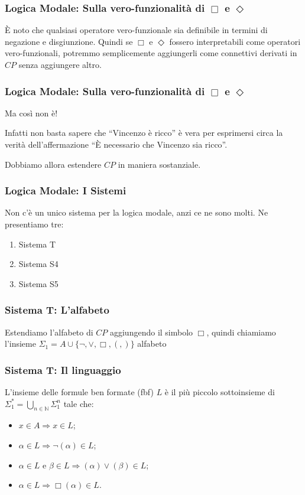 \documentclass[notheorem]{beamer}
\begin{document}
\begin{frame}
\frametitle{Logica Modale: Sulla vero-funzionalità di $\Box$ e $\Diamond$}
È noto che qualsiasi operatore vero-funzionale sia definibile in termini
di negazione e disgiunzione. Quindi se $\Box$ e $\Diamond$ fossero interpretabili
come operatori vero-funzionali, potremmo semplicemente aggiungerli come connettivi
derivati in $CP$ senza aggiungere altro.

\end{frame}

\begin{frame}
\frametitle{Logica Modale: Sulla vero-funzionalità di $\Box$ e $\Diamond$}
Ma così non è!

Infatti non basta sapere che ``Vincenzo è ricco'' è vera per esprimersi
circa la verità dell'affermazione ``È necessario che Vincenzo sia ricco''.

Dobbiamo allora estendere $CP$ in maniera sostanziale.
\end{frame}

\begin{frame}
\frametitle{Logica Modale: I Sistemi}

Non c'è un unico sistema per la logica modale, anzi ce ne sono molti.
Ne presentiamo tre:
\begin{enumerate}
\item Sistema T
\item Sistema S4
\item Sistema S5
\end{enumerate}
\end{frame}

\begin{frame}
\frametitle{Sistema T: L'alfabeto}
Estendiamo l'alfabeto di $CP$ aggiungendo il simbolo $\Box$, quindi
chiamiamo l'insieme $\Sigma_1 = A \cup \{\neg, \lor, \Box, (, )\}$ alfabeto

\end{frame}

\begin{frame}
\frametitle{Sistema T: Il linguaggio}
L'insieme delle formule ben formate (fbf) $L$ è il più piccolo sottoinsieme di
$\Sigma_1^{*} = \bigcup_{n \in \mathbb{N}} \Sigma_1^n$ tale che:
\begin{itemize}
\item $x \in A \Rightarrow x \in L$;
\item $\alpha \in L \Rightarrow \neg (\alpha) \in L$;
\item $\alpha \in L$ e $\beta \in L \Rightarrow (\alpha) \lor (\beta) \in L$;
\item {\color{red} $\alpha \in L \Rightarrow \Box (\alpha) \in L.$}
\end{itemize}
\end{frame}
\end{document}
